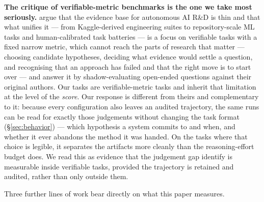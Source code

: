 \textbf{The critique of verifiable-metric benchmarks is the one we take most seriously.}
\citet{kirgis2026openended} argue that the evidence base for autonomous AI R\&D is thin and that what
unifies it --- from Kaggle-derived engineering suites \citep{chan2024mlebench,qiang2025mledojo} to
repository-scale ML tasks \citep{tang2023mlbench} and human-calibrated task batteries
\citep{rein2025hcast} --- is a focus on verifiable tasks with a fixed narrow metric, which cannot reach the parts of
research that matter --- choosing candidate hypotheses, deciding what evidence would settle a question,
and recognising that an approach has failed and that the right move is to start over --- and answer it
by shadow-evaluating open-ended questions against their original authors. Our tasks are verifiable-metric
tasks and inherit that limitation at the level of the \emph{score}. Our response is different from
theirs and complementary to it: because every configuration also leaves an audited trajectory, the same
runs can be read for exactly those judgements without changing the task format
(\S\ref{sec:behavior}) --- which hypothesis a system commits to and when, and whether it ever abandons
the method it was handed. On the tasks where that choice is legible, it separates the artifacts more
cleanly than the reasoning-effort budget does. We read this as evidence that the judgement gap
\citet{kirgis2026openended} identify is measurable inside verifiable tasks, provided the trajectory is
retained and audited, rather than only outside them.

Three further lines of work bear directly on what this paper measures.

